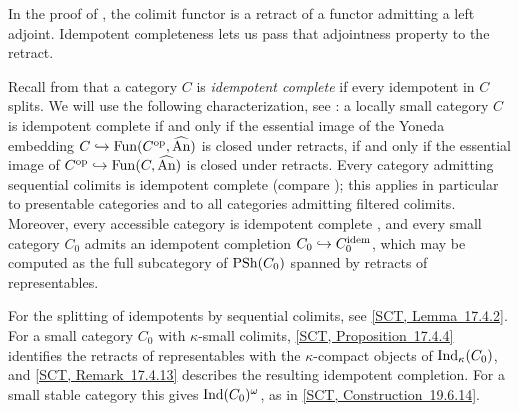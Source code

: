 	\ifdefined\HCode
		In the proof of , the colimit functor is a retract of a functor admitting a left adjoint. Idempotent completeness lets us pass that adjointness property to the retract.
		\par
	\fi
	Recall from \cite[Section~4.4.5]{lurie2009HTT} that a category $C$ is \emph{idempotent complete} if every idempotent in $C$ splits. We will use the following characterization, see \cite[Section~5.1.4]{lurie2009HTT}: a locally small category $C$ is idempotent complete if and only if the essential image of the Yoneda embedding $C \hookrightarrow \operatorname{Fun}(C^{\textup{op}},\widehat{{\textup{An}}})$ is closed under retracts, if and only if the essential image of $C^{\textup{op}} \hookrightarrow \operatorname{Fun}(C,\widehat{{\textup{An}}})$ is closed under retracts. Every category admitting sequential colimits is idempotent complete \cite[Section~4.4.5]{lurie2009HTT} (compare ); this applies in particular to presentable categories and to all categories admitting filtered colimits. Moreover, every accessible category is idempotent complete \cite[Chapter~5]{lurie2009HTT}, and every small category $C_0$ admits an idempotent completion $C_0 \hookrightarrow C_0^{\operatorname{idem}}$, which may be computed as the full subcategory of $\operatorname{PSh}(C_0)$ spanned by retracts of representables.
	\ifdefined\HCode
		\par
		For the splitting of idempotents by sequential colimits, see \href{https://animarium.org/tag/111F/}{[SCT, Lemma~17.4.2]}. For a small category $C_0$ with $\kappa$-small colimits, \href{https://animarium.org/tag/111H/}{[SCT, Proposition~17.4.4]} identifies the retracts of representables with the $\kappa$-compact objects of $\operatorname{Ind}_{\kappa}(C_0)$, and \href{https://animarium.org/tag/111P/}{[SCT, Remark~17.4.13]} describes the resulting idempotent completion. For a small stable category this gives $\operatorname{Ind}(C_0)^{\omega}$, as in \href{https://animarium.org/tag/115B/}{[SCT, Construction~19.6.14]}.
	\fi

